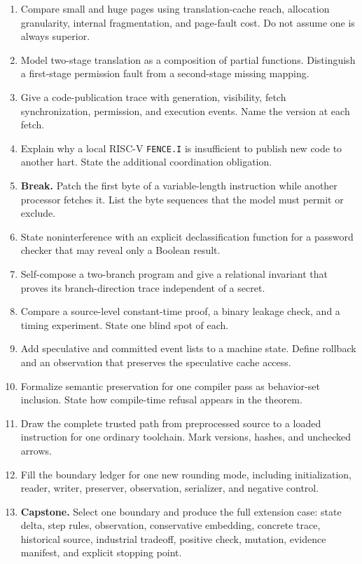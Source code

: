 \begin{enumerate}
cache entry. Give a trace that accesses the old physical frame.
\item Compare small and huge pages using translation-cache reach, allocation
granularity, internal fragmentation, and page-fault cost. Do not assume one is
always superior.
\item Model two-stage translation as a composition of partial functions.
Distinguish a first-stage permission fault from a second-stage missing mapping.
\item Give a code-publication trace with generation, visibility, fetch
synchronization, permission, and execution events. Name the version at each
fetch.
\item Explain why a local RISC-V \texttt{FENCE.I} is insufficient to publish
new code to another hart. State the additional coordination obligation.
\item \textbf{Break.} Patch the first byte of a variable-length instruction
while another processor fetches it. List the byte sequences that the model must
permit or exclude.
\item State noninterference with an explicit declassification function for a
password checker that may reveal only a Boolean result.
\item Self-compose a two-branch program and give a relational invariant that
proves its branch-direction trace independent of a secret.
\item Compare a source-level constant-time proof, a binary leakage check, and
a timing experiment. State one blind spot of each.
\item Add speculative and committed event lists to a machine state. Define
rollback and an observation that preserves the speculative cache access.
\item Formalize semantic preservation for one compiler pass as behavior-set
inclusion. State how compile-time refusal appears in the theorem.
\item Draw the complete trusted path from preprocessed source to a loaded
instruction for one ordinary toolchain. Mark versions, hashes, and unchecked
arrows.
\item Fill the boundary ledger for one new rounding mode, including
initialization, reader, writer, preserver, observation, serializer, and
negative control.
\item \textbf{Capstone.} Select one boundary and produce the full extension
case: state delta, step rules, observation, conservative embedding, concrete
trace, historical source, industrial tradeoff, positive check, mutation,
evidence manifest, and explicit stopping point.
\end{enumerate}
